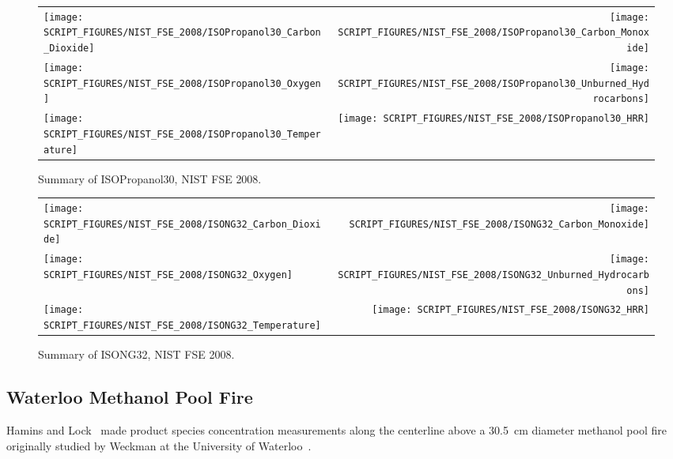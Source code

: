 \begin{figure}[p]
\begin{tabular*}{\textwidth}{l@{\extracolsep{\fill}}r}
\texttt{[image: SCRIPT\_FIGURES/NIST\_FSE\_2008/ISOPropanol30\_Carbon\_Dioxide]} &
\texttt{[image: SCRIPT\_FIGURES/NIST\_FSE\_2008/ISOPropanol30\_Carbon\_Monoxide]} \\
\texttt{[image: SCRIPT\_FIGURES/NIST\_FSE\_2008/ISOPropanol30\_Oxygen]} &
\texttt{[image: SCRIPT\_FIGURES/NIST\_FSE\_2008/ISOPropanol30\_Unburned\_Hydrocarbons]} \\
\texttt{[image: SCRIPT\_FIGURES/NIST\_FSE\_2008/ISOPropanol30\_Temperature]} &
\texttt{[image: SCRIPT\_FIGURES/NIST\_FSE\_2008/ISOPropanol30\_HRR]}
\end{tabular*}
\caption[Summary of ISOPropanol30, NIST FSE 2008]{Summary of ISOPropanol30, NIST FSE 2008.}
\label{NIST_FSE_1994_ISOPropanol30}
\end{figure}

\begin{figure}[p]
\begin{tabular*}{\textwidth}{l@{\extracolsep{\fill}}r}
\texttt{[image: SCRIPT\_FIGURES/NIST\_FSE\_2008/ISONG32\_Carbon\_Dioxide]} &
\texttt{[image: SCRIPT\_FIGURES/NIST\_FSE\_2008/ISONG32\_Carbon\_Monoxide]} \\
\texttt{[image: SCRIPT\_FIGURES/NIST\_FSE\_2008/ISONG32\_Oxygen]} &
\texttt{[image: SCRIPT\_FIGURES/NIST\_FSE\_2008/ISONG32\_Unburned\_Hydrocarbons]} \\
\texttt{[image: SCRIPT\_FIGURES/NIST\_FSE\_2008/ISONG32\_Temperature]} &
\texttt{[image: SCRIPT\_FIGURES/NIST\_FSE\_2008/ISONG32\_HRR]}
\end{tabular*}
\caption[Summary of ISONG32, NIST FSE 2008]{Summary of ISONG32, NIST FSE 2008.}
\label{NIST_FSE_1994_ISONG32}
\end{figure}


\clearpage

\subsection{Waterloo Methanol Pool Fire}
\label{sec:Waterloo_Methanol}

Hamins and Lock~\cite{Hamins:TN1928} made product species concentration measurements along the centerline above a 30.5~cm diameter methanol pool fire originally studied by Weckman at the University of Waterloo~\cite{Weckman:CF1996}.

